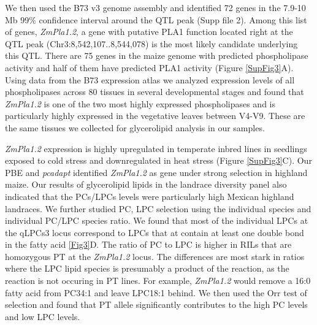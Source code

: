 \documentclass[9pt,twocolumn,twoside]{BioRxiv}
\begin{document}
We then used the B73 v3 genome assembly and identified 72 genes in the 7.9-10 Mb 99\% confidence interval around the QTL peak (Supp file 2). 
Among this list of genes, \textit{ZmPla1.2}, a gene with putative PLA1 function located right at the QTL peak (Chr3:8,542,107..8,544,078) is the most likely candidate underlying this QTL. 
There are 75 genes in the maize genome with predicted phospholipase activity and half of them have predicted PLA1 activity (Figure \ref{SupFig3}A). 
Using data from the B73 expression atlas \cite{Stelpflug2016-vr} we analyzed expression levels of all phospholipases across 80 tissues in several developmental stages and found that \textit{ZmPla1.2} is one of the two most highly expressed phospholipases and is particularly highly expressed in the vegetative leaves between V4-V9. These are the same tissues we collected for glycerolipid analysis in our samples. 

\textit{ZmPla1.2} expression is highly upregulated in temperate inbred lines in seedlings exposed to cold stress and downregulated in heat stress (Figure \ref{SupFig3}C). 
Our PBE and \textit{pcadapt} identified \textit{ZmPla1.2} as gene under strong selection in highland maize. 
Our results of glycerolipid lipids in the landrace diversity panel also  indicated that the PCs/LPCs levels were particularly high Mexican highland landraces. 
We further studied PC, LPC selection using the individual species and individual PC/LPC species ratio. 
We found that most of the individual LPCs at the qLPCs3 locus correspond to LPCs that at contain at least one double bond in the fatty acid \ref{Fig3}D. The ratio of PC to LPC is higher in RILs that are homozygous PT at the \textit{ZmPla1.2} locus. The differences are most stark in ratios where the LPC lipid species is presumably a product of the reaction, as the reaction is not occuring in PT lines. For example, \textit{ZmPla1.2} would remove a 16:0 fatty acid from PC34:1 and leave LPC18:1 behind. We then used the Orr test of selection and found that PT allele significantly contributes to the high PC levels and low LPC levels. 
\end{document}
